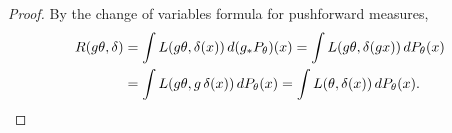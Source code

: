 \begin{proof}
  By the change of variables formula for pushforward measures,
  \begin{align*}
    R(g\theta, \delta)
      &= \int L(g\theta, \delta(x))\, d(g_* P_\theta)(x)
       = \int L(g\theta, \delta(gx))\, dP_\theta(x) \\
      &= \int L(g\theta, g\,\delta(x))\, dP_\theta(x)
       = \int L(\theta, \delta(x))\, dP_\theta(x). \qedhere
  \end{align*}
\end{proof}

